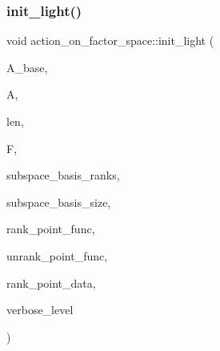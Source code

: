 \subsubsection{\texorpdfstring{init\+\_\+light()}{init\_light()}}
{\footnotesize\ttfamily void action\+\_\+on\+\_\+factor\+\_\+space\+::init\+\_\+light (\begin{DoxyParamCaption}\item[{\mbox{\hyperlink{classaction}{action}} \&}]{A\+\_\+base,  }\item[{\mbox{\hyperlink{classaction}{action}} \&}]{A,  }\item[{\mbox{\hyperlink{galois_8h_a09fddde158a3a20bd2dcadb609de11dc}{I\+NT}}}]{len,  }\item[{\mbox{\hyperlink{classfinite__field}{finite\+\_\+field}} $\ast$}]{F,  }\item[{\mbox{\hyperlink{galois_8h_a09fddde158a3a20bd2dcadb609de11dc}{I\+NT}} $\ast$}]{subspace\+\_\+basis\+\_\+ranks,  }\item[{\mbox{\hyperlink{galois_8h_a09fddde158a3a20bd2dcadb609de11dc}{I\+NT}}}]{subspace\+\_\+basis\+\_\+size,  }\item[{\mbox{\hyperlink{galois_8h_a09fddde158a3a20bd2dcadb609de11dc}{I\+NT}}($\ast$)(\mbox{\hyperlink{galois_8h_a09fddde158a3a20bd2dcadb609de11dc}{I\+NT}} $\ast$\mbox{\hyperlink{simeon_8_c_aeb3f3030944801b163bc3b829a7f6710}{v}}, void $\ast$data)}]{rank\+\_\+point\+\_\+func,  }\item[{void($\ast$)(\mbox{\hyperlink{galois_8h_a09fddde158a3a20bd2dcadb609de11dc}{I\+NT}} $\ast$\mbox{\hyperlink{simeon_8_c_aeb3f3030944801b163bc3b829a7f6710}{v}}, \mbox{\hyperlink{galois_8h_a09fddde158a3a20bd2dcadb609de11dc}{I\+NT}} rk, void $\ast$data)}]{unrank\+\_\+point\+\_\+func,  }\item[{void $\ast$}]{rank\+\_\+point\+\_\+data,  }\item[{\mbox{\hyperlink{galois_8h_a09fddde158a3a20bd2dcadb609de11dc}{I\+NT}}}]{verbose\+\_\+level }\end{DoxyParamCaption})}

\mbox{\label{classaction__on__factor__space_a33e754f3a9ccf760c12a3d3f40d66140}} 
